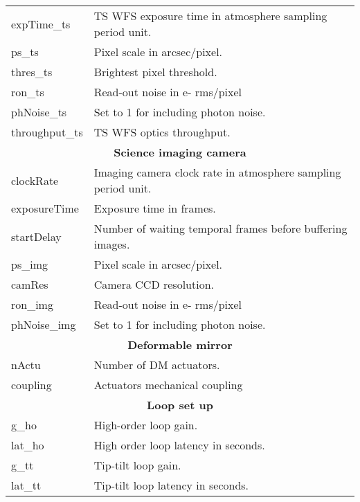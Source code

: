 \documentclass[12pt]{article}
\begin{document}
\begin{table}[H]
\begin{scriptsize}
\begin{tabular}{p{2.5cm}p{7cm}}
	expTime\_ts          & TS WFS exposure time in atmosphere sampling period unit.\\                             
	ps\_ts        & Pixel scale in arcsec/pixel.\\                       
	thres\_ts           & Brightest pixel threshold.\\                                 
	ron\_ts      & Read-out noise in e- rms/pixel\\                                           
	phNoise\_ts       &Set to 1 for including photon noise.\\                                  
	throughput\_ts        & TS WFS optics throughput.\\                              
	\hline
	\multicolumn{2}{c}{\textbf{Science imaging camera}} \\
	\hline
	clockRate           & Imaging camera clock rate in atmosphere sampling period unit.\\                                
	exposureTime        & Exposure time in frames.\\                           
	startDelay          & Number of waiting temporal frames before buffering images.\\                              
	ps\_img       & Pixel scale in arcsec/pixel.\\                                
	camRes              & Camera CCD resolution.\\                               
	ron\_img       & Read-out noise in e- rms/pixel\\                                   
	phNoise\_img   &Set to 1 for including photon noise.\\                                  
	\hline
	\multicolumn{2}{c}{\textbf{Deformable mirror}} \\
	\hline
	nActu               & Number of DM actuators.\\                           
	coupling     & Actuators mechanical coupling\\                             
	\hline
	\multicolumn{2}{c}{\textbf{Loop set up}} \\
	\hline
	g\_ho          & High-order loop gain.\\                              
	lat\_ho           & High order loop latency in seconds.\\              
	g\_tt          & Tip-tilt loop gain.\\                              
	lat\_tt           & Tip-tilt loop latency in seconds.\\              

\end{tabular}
\end{scriptsize}
\end{table}
\end{document}

